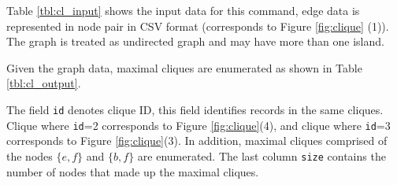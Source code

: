 Table \ref{tbl:cl_input} shows the input data for this command, edge data is represented in node pair in CSV format (corresponds to Figure \ref{fig:clique} (1)). 
The graph is treated as undirected graph and may have more than one island.  

Given the graph data, maximal cliques are enumerated as shown in Table \ref{tbl:cl_output}. 

The field \verb|id| denotes clique ID, this field identifies records in the same cliques. 
Clique where \verb|id|=2 corresponds to Figure \ref{fig:clique}(4), 
and clique where \verb|id|=3 corresponds to Figure \ref{fig:clique}(3). 
In addition, maximal cliques comprised of the nodes $\{e,f\}$ and $\{b,f\}$ are enumerated. 
The last column \verb|size| contains the number of nodes that made up the maximal cliques. 


 

\vspace{1em}

